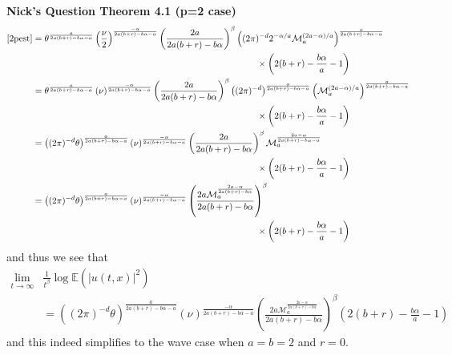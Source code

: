 \documentclass[a4paper,11pt]{article}
\numberwithin{equation}{section}
\theoremstyle{plain}
\theoremstyle{definition}
\newcounter{NQ}
\newenvironment{NickQuestion}[1][] %
{\refstepcounter{NQ}
	\begin{mdframed}[backgroundcolor=lightgray]\textbf{Nick's Question \theNQ \: #1~~}~~~\noindent}%
	{\end{mdframed}}
\numberwithin{NQ}{section}
\numberwithin{LQ}{section}
\numberwithin{ZQ}{section}
\begin{document}
\begin{NickQuestion}[Theorem 4.1 (p=2 case)]
		\begin{align*}
		\ref{2pest} &= \theta^{\frac{a}{2a(b+r)-b\alpha-a}}\left(\frac{\nu}{2}\right)^{\frac{-\alpha}{2a(b+r)-b\alpha -a}}\left( \frac{2a}{2a(b+r)- b\alpha} \right)^\beta \left((2\pi)^{-d}2^{-\alpha/a}\mathcal{M}_a^{(2a-\alpha)/a} \right)^{\frac{a}{2a(b+r)-b\alpha-a}}
		\\&\hspace{25em} \times \left(2(b+r)-\frac{b\alpha}{a}-1\right)
		\\& = \theta^{\frac{a}{2a(b+r)-b\alpha-a}}\left(\nu\right)^{\frac{-\alpha}{2a(b+r)-b\alpha -a}}\left( \frac{2a}{2a(b+r)- b\alpha} \right)^\beta \left((2\pi)^{-d}\right)^{\frac{a}{2a(b+r)-b\alpha-a}} \left(\mathcal{M}_a^{(2a-\alpha)/a} \right)^{\frac{a}{2a(b+r)-b\alpha-a}}
		\\&\hspace{25em} \times \left(2(b+r)-\frac{b\alpha}{a}-1\right)
		\\&= \left((2\pi)^{-d}\theta\right)^{\frac{a}{2a(b+r)-b\alpha-a}}\left(\nu\right)^{\frac{-\alpha}{2a(b+r)-b\alpha -a}}\left( \frac{2a}{2a(b+r)- b\alpha} \right)^\beta \mathcal{M}_a^{\frac{2a-\alpha}{2a(b+r)-b\alpha-a}}
		\\&\hspace{25em} \times \left(2(b+r)-\frac{b\alpha}{a}-1\right)
		\\&= \left((2\pi)^{-d}\theta\right)^{\frac{a}{2a(b+r)-b\alpha-a}}\left(\nu\right)^{\frac{-\alpha}{2a(b+r)-b\alpha -a}}\left( \frac{2a \mathcal{M}_a^{\frac{2a-\alpha}{2a(b+r)-b\alpha}} }{2a(b+r)- b\alpha} \right)^\beta
		\\&\hspace{25em} \times \left(2(b+r)-\frac{b\alpha}{a}-1\right)
		\end{align*}
		and thus we see that
		\begin{align}
		\lim_{t\to \infty} & \frac{1}{t^\beta} \log \mathbb{E}(|u(t,x)|^2) \nonumber
		\\&= \left((2\pi)^{-d}\theta\right)^{\frac{a}{2a(b+r)-b\alpha-a}}\left(\nu\right)^{\frac{-\alpha}{2a(b+r)-b\alpha -a}}\left( \frac{2a \mathcal{M}_a^{\frac{2a-\alpha}{2a(b+r)-b\alpha}} }{2a(b+r)- b\alpha} \right)^\beta \left(2(b+r)-\frac{b\alpha}{a}-1\right) \label{2pest2}
		\end{align}
		and this indeed simplifies to the wave case when $a=b=2$ and $r=0$.
	\end{NickQuestion}
\end{document}

